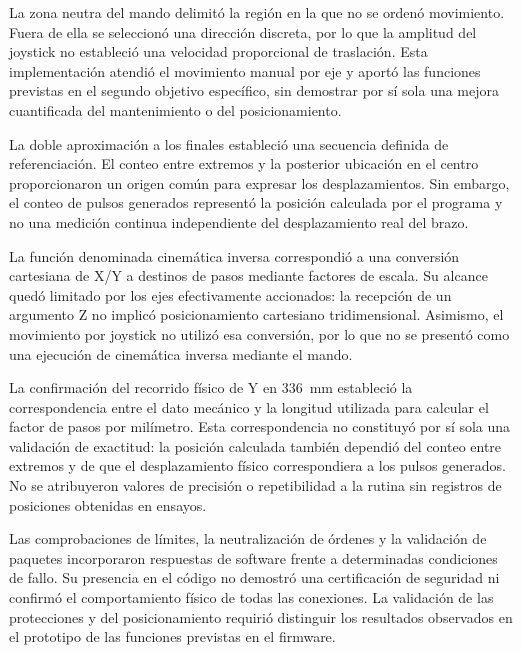 La zona neutra del mando delimitó la región en la que no se ordenó movimiento. Fuera de ella se seleccionó una dirección discreta, por lo que la amplitud del joystick no estableció una velocidad proporcional de traslación. Esta implementación atendió el movimiento manual por eje y aportó las funciones previstas en el segundo objetivo específico, sin demostrar por sí sola una mejora cuantificada del mantenimiento o del posicionamiento.

La doble aproximación a los finales estableció una secuencia definida de referenciación. El conteo entre extremos y la posterior ubicación en el centro proporcionaron un origen común para expresar los desplazamientos. Sin embargo, el conteo de pulsos generados representó la posición calculada por el programa y no una medición continua independiente del desplazamiento real del brazo.

La función denominada cinemática inversa correspondió a una conversión cartesiana de X/Y a destinos de pasos mediante factores de escala. Su alcance quedó limitado por los ejes efectivamente accionados: la recepción de un argumento Z no implicó posicionamiento cartesiano tridimensional. Asimismo, el movimiento por joystick no utilizó esa conversión, por lo que no se presentó como una ejecución de cinemática inversa mediante el mando.

La confirmación del recorrido físico de Y en 336~mm estableció la correspondencia entre el dato mecánico y la longitud utilizada para calcular el factor de pasos por milímetro. Esta correspondencia no constituyó por sí sola una validación de exactitud: la posición calculada también dependió del conteo entre extremos y de que el desplazamiento físico correspondiera a los pulsos generados. No se atribuyeron valores de precisión o repetibilidad a la rutina sin registros de posiciones obtenidas en ensayos.

Las comprobaciones de límites, la neutralización de órdenes y la validación de paquetes incorporaron respuestas de software frente a determinadas condiciones de fallo. Su presencia en el código no demostró una certificación de seguridad ni confirmó el comportamiento físico de todas las conexiones. La validación de las protecciones y del posicionamiento requirió distinguir los resultados observados en el prototipo de las funciones previstas en el firmware.
